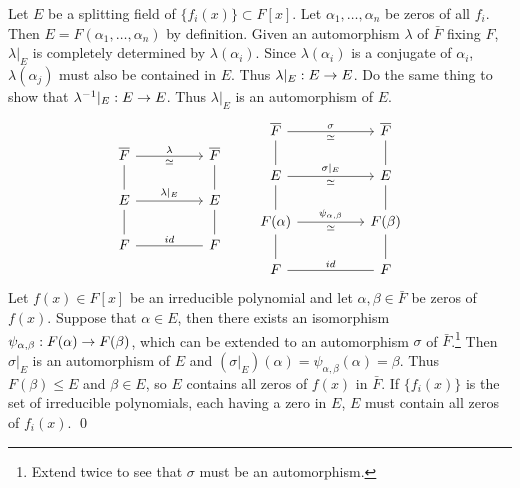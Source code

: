 \pf \note{\mimp} Let \(E\) be a splitting field of \(\{f_i(x)\} \subset F[x]\). Let \(\alpha_1, \dots, \alpha_n\) be zeros of all \(f_i\). Then \(E = F(\alpha_1, \dots, \alpha_n)\) by definition. Given an automorphism \(\lambda\) of \(\bar{F}\) fixing \(F\), \(\lambda |_E\) is completely determined by \(\lambda(\alpha_i)\). Since \(\lambda(\alpha_i)\) is a conjugate of \(\alpha_i\), \(\lambda(\alpha_j)\) must also be contained in \(E\). Thus \(\lambda |_E : E \rightarrow E\). Do the same thing to show that \(\lambda^{-1}|_E : E \rightarrow E\). Thus \(\lambda|_E\) is an automorphism of \(E\).
\[
    \begin{tikzcd}
        \bar{F} \arrow[dash]{d} \arrow{rr}{\lambda}[swap]{\simeq} && \bar{F} \arrow[dash]{d} \\
        E \arrow[dash]{d} \arrow{rr}{\lambda|_E} && E \arrow[dash]{d} \\
        F \arrow[dash]{rr}{id} && F
    \end{tikzcd}
    \qquad
    \begin{tikzcd}
        \bar{F} \arrow[dash]{d} \arrow{rr}{\sigma}[swap]{\simeq} && \bar{F} \arrow[dash]{d} \\
        E \arrow[dash]{d} \arrow{rr}{\sigma|_E}[swap]{\simeq} && E \arrow[dash]{d} \\
        F(\alpha) \arrow[dash]{d} \arrow{rr}{\psi_{\alpha, \beta}}[swap]{\simeq} && F(\beta) \arrow[dash]{d} \\
        F \arrow[dash]{rr}{id} && F
    \end{tikzcd}
\]
\note{\mimpd} Let \(f(x) \in F[x]\) be an irreducible polynomial and let \(\alpha, \beta \in \bar{F}\) be zeros of \(f(x)\). Suppose that \(\alpha \in E\), then there exists an isomorphism \(\psi_{\alpha, \beta} : F(\alpha) \rightarrow F(\beta)\), which can be extended to an automorphism \(\sigma\) of \(\bar{F}\).\footnote{Extend twice to see that \(\sigma\) must be an automorphism.} Then \(\sigma|_E\) is an automorphism of \(E\) and \((\sigma|_E)(\alpha) = \psi_{\alpha, \beta}(\alpha) = \beta\). Thus \(F(\beta) \leq E\) and \(\beta \in E\), so \(E\) contains all zeros of \(f(x)\) in \(\bar{F}\). If \(\{f_i(x)\}\) is the set of irreducible polynomials, each having a zero in \(E\), \(E\) must contain all zeros of \(f_i(x)\). \qed

\pagebreak
